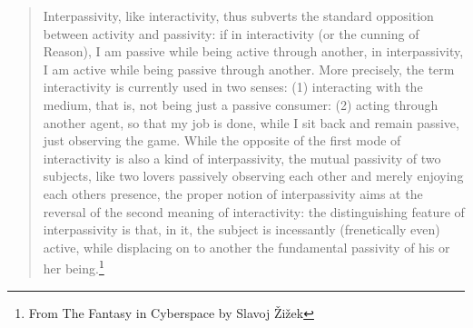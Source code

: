\begin{quote}
Interpassivity, like interactivity, thus subverts the standard opposition between activity and passivity: if in interactivity (or the cunning of Reason), I am passive while being active through another, in interpassivity, I am active while being passive through another. More precisely, the term interactivity is currently used in two senses: (1) interacting with the medium, that is, not being just a passive consumer: (2) acting through another agent, so that my job is done, while I sit back and remain passive, just observing the game. While the opposite of the first mode of interactivity is also a kind of interpassivity, the mutual passivity of two subjects, like two lovers passively observing each other and merely enjoying each others presence, the proper notion of interpassivity aims at the reversal of the second meaning of interactivity: the distinguishing feature of interpassivity is that, in it, the subject is incessantly (frenetically even) active, while displacing on to another the fundamental passivity of his or her being.\footnote{From The Fantasy in Cyberspace by Slavoj \v{Z}i\v{z}ek}
\end{quote}



\label{ch:compamp}